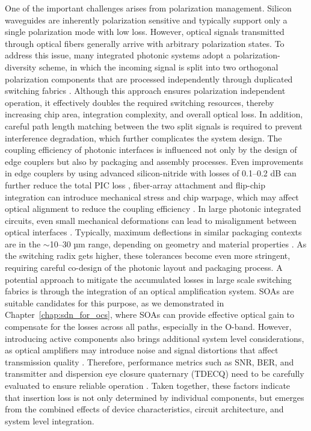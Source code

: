 One of the important challenges arises from polarization management.
Silicon waveguides are inherently polarization sensitive and typically support only a single polarization mode with low loss.
However, optical signals transmitted through optical fibers generally arrive with arbitrary polarization states.
To address this issue, many integrated photonic systems adopt a polarization-diversity scheme, in which the incoming signal is split into two orthogonal polarization components that are processed independently through duplicated switching fabrics \cite{tanizawa2016novelpola, kurosu2019high}.
Although this approach ensures polarization independent operation, it effectively doubles the required switching resources, thereby increasing chip area, integration complexity, and overall optical loss.
In addition, careful path length matching between the two split signals is required to prevent interference degradation, which further complicates the system design.
The coupling efficiency of photonic interfaces is influenced not only by the design of edge couplers but also by packaging and assembly processes.
Even improvements in edge couplers by using advanced silicon-nitride with losses of 0.1–0.2 dB can further reduce the total PIC loss \cite{psiquantum2025manufacturable},
fiber-array attachment and flip-chip integration can introduce mechanical stress and chip warpage, which may affect optical alignment to reduce the coupling efficiency \cite{tian2025photonic, hall2025innovations}.
In large photonic integrated circuits, even small mechanical deformations can lead to misalignment between optical interfaces \cite{tian2023passive}.
Typically, maximum deflections in similar packaging contexts are in the $\sim$10–30 µm range, depending on geometry and material properties \cite{ma14133723}.
As the switching radix gets higher, these tolerances become even more stringent, requiring careful co-design of the photonic layout and packaging process.
A potential approach to mitigate the accumulated losses in large scale switching fabrics is through the integration of an optical amplification system.
SOAs are suitable candidates for this purpose, as we demonstrated in Chapter~\ref{chap:sdn_for_ocs}, where SOAs can provide effective optical gain to compensate for the losses across all paths, especially in the O-band.
However, introducing active components also brings additional system level considerations, as optical amplifiers may introduce noise and signal distortions that affect transmission quality \cite{ASSADIHAGHI2010158, lippiatt2024analysis}.
Therefore, performance metrics such as SNR, BER, and transmitter and dispersion eye closure quaternary (TDECQ) need to be carefully evaluated to ensure reliable operation \cite{baney2000theory}.
Taken together, these factors indicate that insertion loss is not only determined by individual components, but emerges from the combined effects of device characteristics, circuit architecture, and system level integration.
